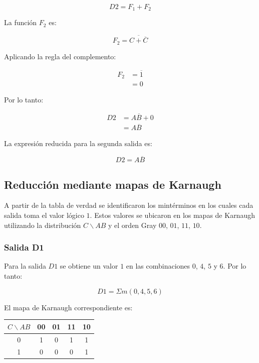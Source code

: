 \documentclass[12pt]{report}
\begin{document}
\begin{equation}
    D2 = F_1 + F_2
\end{equation}

La función $F_2$ es:

\begin{equation}
    F_2 = \overline{C+\overline{C}}
\end{equation}

Aplicando la regla del complemento:

\begin{align}
    F_2
    &= \overline{1} \\
    &= 0
\end{align}

Por lo tanto:

\begin{align}
    D2
    &= A\overline{B} + 0 \\
    &= A\overline{B}
\end{align}

La expresión reducida para la segunda salida es:

\begin{equation}
    \boxed{
    D2 = A\overline{B}
    }
\end{equation}


\subsection{Reducción mediante mapas de Karnaugh}

A partir de la tabla de verdad se identificaron los mintérminos en los cuales cada
salida toma el valor lógico $1$. Estos valores se ubicaron en los mapas de Karnaugh
utilizando la distribución $C\backslash AB$ y el orden Gray $00$, $01$, $11$, $10$.

\subsubsection{Salida D1}

Para la salida $D1$ se obtiene un valor $1$ en las combinaciones $0$, $4$, $5$ y $6$.
Por lo tanto:

\begin{equation}
    D1 = \Sigma m(0,4,5,6)
\end{equation}

El mapa de Karnaugh correspondiente es:

\begin{center}
\begin{tabular}{c|cccc}
    $C\backslash AB$ & 00 & 01 & 11 & 10 \\
    \hline
    0 & 1 & 0 & 1 & 1 \\
    1 & 0 & 0 & 0 & 1
\end{tabular}
\end{center}
\end{document}
